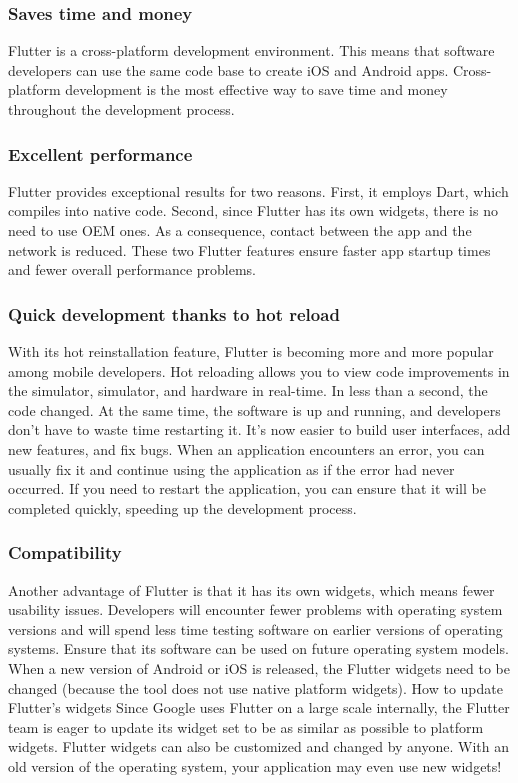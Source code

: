 \subsubsection{Saves time and money}
Flutter is a cross-platform development environment. This means that software developers can use the same code base to create iOS and Android apps. Cross-platform development is the most effective way to save time and money throughout the development process.
\subsubsection{Excellent performance}
Flutter provides exceptional results for two reasons. First, it employs Dart, which compiles into native code. Second, since Flutter has its own widgets, there is no need to use OEM ones. As a consequence, contact between the app and the network is reduced. These two Flutter features ensure faster app startup times and fewer overall performance problems.
\subsubsection{Quick development thanks to hot reload}
With its hot reinstallation feature, Flutter is becoming more and more popular among mobile developers. Hot reloading allows you to view code improvements in the simulator, simulator, and hardware in real-time. In less than a second, the code changed. At the same time, the software is up and running, and developers don't have to waste time restarting it. It’s now easier to build user interfaces, add new features, and fix bugs. When an application encounters an error, you can usually fix it and continue using the application as if the error had never occurred. If you need to restart the application, you can ensure that it will be completed quickly, speeding up the development process.
\subsubsection{Compatibility}
Another advantage of Flutter is that it has its own widgets, which means fewer usability issues. Developers will encounter fewer problems with operating system versions and will spend less time testing software on earlier versions of operating systems. Ensure that its software can be used on future operating system models. When a new version of Android or iOS is released, the Flutter widgets need to be changed (because the tool does not use native platform widgets). How to update Flutter's widgets Since Google uses Flutter on a large scale internally, the Flutter team is eager to update its widget set to be as similar as possible to platform widgets. Flutter widgets can also be customized and changed by anyone. With an old version of the operating system, your application may even use new widgets!
